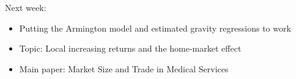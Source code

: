 \documentclass[10pt,notes=hide,aspectratio=169]{beamer}
\begin{document}
\begin{frame}[plain]
Next week:
\begin{itemize}
	\item Putting the Armington model and estimated gravity regressions to work 
	\item Topic: Local increasing returns and the home-market effect
	\item Main paper: Market Size and Trade in Medical Services
\end{itemize}
\end{frame}
\end{document}

